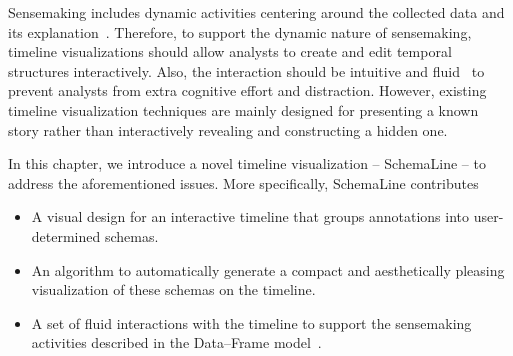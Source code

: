 Sensemaking includes dynamic activities centering around the collected data and its explanation~\cite{Klein2003}. Therefore, to support the dynamic nature of sensemaking, timeline visualizations should allow analysts to create and edit temporal structures interactively. Also, the interaction should be intuitive and fluid~\cite{Elmqvist2011} to prevent analysts from extra cognitive effort and distraction. However, existing timeline visualization techniques are mainly designed for presenting a known story rather than interactively revealing and constructing a hidden one.

In this chapter, we introduce a novel timeline visualization -- SchemaLine -- to address the aforementioned issues. More specifically, SchemaLine contributes
\begin{itemize}
	\item A visual design for an interactive timeline that groups annotations into user-determined schemas.
	\item An algorithm to automatically generate a compact and aesthetically pleasing visualization of these schemas on the timeline.
	\item A set of fluid interactions with the timeline to support the sensemaking activities described in the Data--Frame model~\cite{Klein2003}.
\end{itemize}